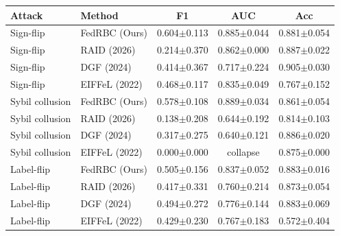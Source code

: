 \begin{tabular}{llccc}
\toprule
Attack & Method & F1 & AUC & Acc \\
\midrule
Sign-flip & FedRBC (Ours) & 0.604$\pm$0.113 & 0.885$\pm$0.044 & 0.881$\pm$0.054 \\
Sign-flip & RAID (2026) & 0.214$\pm$0.370 & 0.862$\pm$0.000 & 0.887$\pm$0.022 \\
Sign-flip & DGF (2024) & 0.414$\pm$0.367 & 0.717$\pm$0.224 & 0.905$\pm$0.030 \\
Sign-flip & EIFFeL (2022) & 0.468$\pm$0.117 & 0.835$\pm$0.049 & 0.767$\pm$0.152 \\
Sybil collusion & FedRBC (Ours) & 0.578$\pm$0.108 & 0.889$\pm$0.034 & 0.861$\pm$0.054 \\
Sybil collusion & RAID (2026) & 0.138$\pm$0.208 & 0.644$\pm$0.192 & 0.814$\pm$0.103 \\
Sybil collusion & DGF (2024) & 0.317$\pm$0.275 & 0.640$\pm$0.121 & 0.886$\pm$0.020 \\
Sybil collusion & EIFFeL (2022) & 0.000$\pm$0.000 & collapse & 0.875$\pm$0.000 \\
Label-flip & FedRBC (Ours) & 0.505$\pm$0.156 & 0.837$\pm$0.052 & 0.883$\pm$0.016 \\
Label-flip & RAID (2026) & 0.417$\pm$0.331 & 0.760$\pm$0.214 & 0.873$\pm$0.054 \\
Label-flip & DGF (2024) & 0.494$\pm$0.272 & 0.776$\pm$0.144 & 0.883$\pm$0.069 \\
Label-flip & EIFFeL (2022) & 0.429$\pm$0.230 & 0.767$\pm$0.183 & 0.572$\pm$0.404 \\
\bottomrule
\end{tabular}
